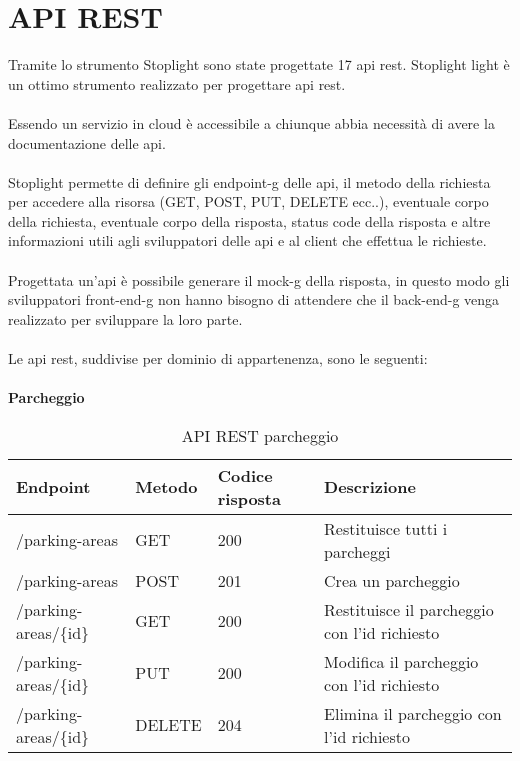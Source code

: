 \section{API REST}
Tramite lo strumento Stoplight sono state progettate 17 \gls{api} \gls{rest}. Stoplight light è un ottimo strumento realizzato
per progettare \gls{api} \gls{rest}.
\\\\
Essendo un servizio in cloud è accessibile a chiunque abbia necessità di avere la documentazione delle \gls{api}.
\\\\
Stoplight permette di definire gli \gls{endpoint-g} delle \gls{api}, il metodo della richiesta per accedere alla risorsa (GET, POST, PUT, DELETE ecc..),
eventuale corpo della richiesta, eventuale corpo della risposta, status code della risposta e altre informazioni
utili agli sviluppatori delle \gls{api} e al client che effettua le richieste.
\\\\
Progettata un'\gls{api} è possibile generare il \gls{mock-g} della risposta, in questo modo gli sviluppatori \gls{front-end-g} non hanno bisogno
di attendere che il \gls{back-end-g} venga realizzato per sviluppare la loro parte.
\\\\
Le \gls{api} \gls{rest}, suddivise per dominio di appartenenza, sono le seguenti:
\\\\
\textbf{Parcheggio}
\\
\begin{table}[H]
    \begin{tabular}{|p{3.2cm}|p{1.4cm}|p{1.4cm}|p{5.8cm}|} 
    \hline
    \textbf{Endpoint} & \textbf{Metodo} & \textbf{Codice risposta} & \textbf{Descrizione} \\ 
    \hline
    /parking-areas & GET & 200 & Restituisce tutti i parcheggi \\ 
    \hline
    /parking-areas & POST & 201 & Crea un parcheggio \\ 
    \hline
    /parking-areas/\{id\} & GET & 200 & Restituisce il parcheggio con l'id richiesto \\ 
    \hline
    /parking-areas/\{id\} & PUT & 200 & Modifica il parcheggio con l'id richiesto \\ 
    \hline
    /parking-areas/\{id\} & DELETE & 204 & Elimina il parcheggio con l'id richiesto \\ 
    \hline
    \end{tabular}
    \caption{API REST parcheggio}
\end{table}
